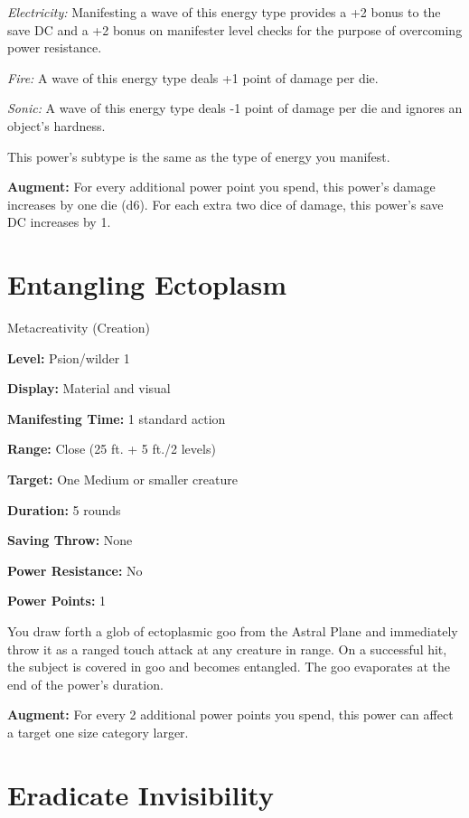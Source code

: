 \documentclass{article}
\begin{document}
\textit{Electricity: }Manifesting a wave of this energy type provides a +2 bonus 
to the save DC and a +2 bonus on manifester level checks for the purpose of overcoming 
power resistance.

\textit{Fire: }A wave of this energy type deals +1 point of damage per die.

\textit{Sonic: }A wave of this energy type deals -1 point of damage per die and 
ignores an object's hardness.

This power's subtype is the same as the type of energy you manifest.

\textbf{Augment:} For every additional power point you spend, this power's damage 
increases by one die (d6). For each extra two dice of damage, this power's save 
DC increases by 1.

\vspace{12pt}
\section*{Entangling Ectoplasm}

Metacreativity (Creation)

\textbf{Level:} Psion/wilder 1

\textbf{Display:} Material and visual

\textbf{Manifesting Time:} 1 standard action

\textbf{Range:} Close (25 ft. + 5 ft./2 levels)

\textbf{Target:} One Medium or smaller creature

\textbf{Duration:} 5 rounds

\textbf{Saving Throw:} None

\textbf{Power Resistance:} No

\textbf{Power Points:} 1

You draw forth a glob of ectoplasmic goo from the Astral Plane and immediately 
throw it as a ranged touch attack at any creature in range. On a successful hit, 
the subject is covered in goo and becomes entangled. The goo evaporates at the 
end of the power's duration.

\textbf{Augment:} For every 2 additional power points you spend, this power can 
affect a target one size category larger.

\vspace{12pt}
\section*{Eradicate Invisibility}
\end{document}
